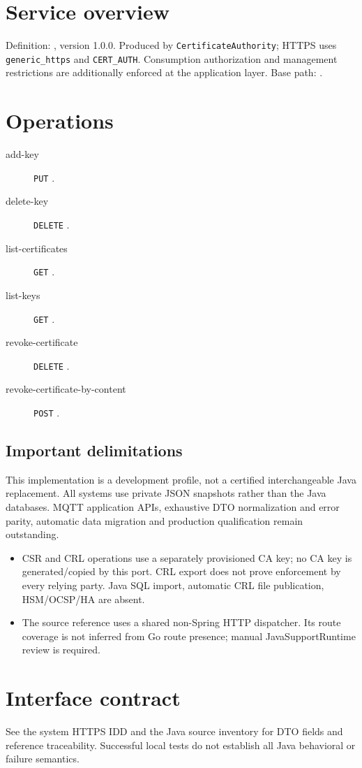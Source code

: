 \documentclass[a4paper]{arrowhead}
\begin{document}
\ArrowheadSetup
\section{Service overview}
Definition: , version 1.0.0. Produced by \texttt{CertificateAuthority}; HTTPS uses \texttt{generic\_https} and \texttt{CERT\_AUTH}. Consumption authorization and management restrictions are additionally enforced at the application layer. Base path: .
\section{Operations}
\begin{description}
\item[add-key] \texttt{PUT} .
\item[delete-key] \texttt{DELETE} .
\item[list-certificates] \texttt{GET} .
\item[list-keys] \texttt{GET} .
\item[revoke-certificate] \texttt{DELETE} .
\item[revoke-certificate-by-content] \texttt{POST} .
\end{description}
\subsection{Important delimitations}
This implementation is a development profile, not a certified interchangeable Java replacement. All systems use private JSON snapshots rather than the Java databases. MQTT application APIs, exhaustive DTO normalization and error parity, automatic data migration and production qualification remain outstanding.
\begin{itemize}
\item CSR and CRL operations use a separately provisioned CA key; no CA key is generated/copied by this port. CRL export does not prove enforcement by every relying party. Java SQL import, automatic CRL file publication, HSM/OCSP/HA are absent.
\item The source reference uses a shared non-Spring HTTP dispatcher. Its route coverage is not inferred from Go route presence; manual JavaSupportRuntime review is required.
\end{itemize}
\section{Interface contract}
See the system HTTPS IDD and the Java source inventory for DTO fields and reference traceability. Successful local tests do not establish all Java behavioral or failure semantics.
\end{document}
